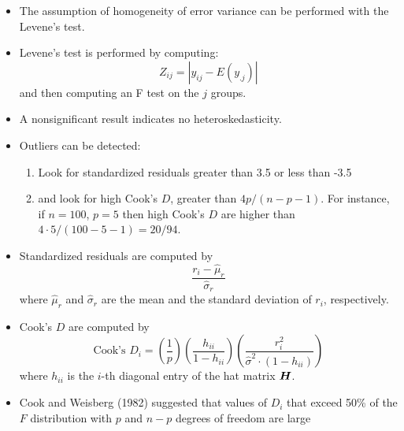 \begin{frame}
  \begin{itemize}
    \vspace{0.75cm}
    \item The assumption of homogeneity of error variance can be performed with the Levene's test.
    \vspace{0.5cm}
    \item Levene's test is performed by computing:
      $$ Z_{ij} = |y_{ij} - E(y_{.j})| $$
      and then computing an F test on the $ j $ groups.
    \vspace{0.5cm}
    \item A nonsignificant result indicates no heteroskedasticity.
  \end{itemize}
\end{frame}

\begin{frame}
  \begin{itemize}
    \vspace{0.75cm}
    \item Outliers can be detected:
      \begin{enumerate}
        \item Look for standardized residuals greater than 3.5 or less than -3.5
        \item and look for high Cook's $ D $, greater than $ 4p/(n-p-1) $. For instance, if $ n = 100 $, $ p = 5 $ then high Cook's $ D $ are higher than $ 4 \cdot 5 / (100-5-1) = 20/94 $.
      \end{enumerate}
    \vspace{0.5cm}
    \item Standardized residuals are computed by 
      $$ \frac{r_i - \hat{\mu}_r}{\hat{\sigma}_r} $$
      where $ \hat{\mu}_r $ and $ \hat{\sigma}_r $ are the mean and the standard deviation of $ r_i $, respectively. 
  \end{itemize}
\end{frame}

\begin{frame}
  \begin{itemize}
    \vspace{0.75cm}
    \item Cook's $ D $ are computed by
      $$ \text{Cook's }D_i = \left(\frac{1}{p}\right)\left(\frac{h_{ii}}{1-h_{ii}}\right)\left(\frac{r_i^2}{\hat{\sigma}^2\cdot(1-h_{ii})}\right) $$
      where $ h_{ii} $ is the $i$-th diagonal entry of the hat matrix $ \boldsymbol{H} $.
    \vspace{0.75cm}
    \item Cook and Weisberg (1982) suggested that values of $ D_i $ that exceed 50\% of the $ F $ distribution with $ p $ and $ n-p $ degrees of freedom are large
  \end{itemize}
\end{frame}

